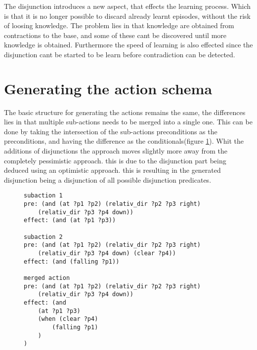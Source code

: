 	

%	
	


	The disjunction introduces a new aspect, that effects the learning process.  Which is that it is no longer possible to discard already learnt episodes,  without the risk of loosing knowledge. The problem lies in that knowledge are obtained from contractions to the base, and some of these cant be discovered until more knowledge is obtained. Furthermore the speed of learning is also effected since the disjunction cant be started to be learn before contradiction can be detected. 
	
	
	
	
\section{Generating the action schema}	
	
	The basic structure for generating the actions remains the same, the differences lies in that multiple sub-actions needs to be merged into a single one. This can be done by taking the intersection of the sub-actions preconditions as the preconditions, and having the difference as the conditionals(figure \ref{merge}). Whit the additions of disjunctions the approach moves slightly more away from the completely pessimistic approach. this is due to the disjunction part being deduced using an optimistic approach. this is resulting in the generated disjunction being a disjunction of all possible disjunction predicates.
\begin{figure}
	\label{merge}
		\begin{lstlisting}
subaction 1
pre: (and (at ?p1 ?p2) (relativ_dir ?p2 ?p3 right) 
	(relativ_dir ?p3 ?p4 down))
effect: (and (at ?p1 ?p3))
		
subaction 2
pre: (and (at ?p1 ?p2) (relativ_dir ?p2 ?p3 right) 
	(relativ_dir ?p3 ?p4 down) (clear ?p4))
effect: (and (falling ?p1))
		
merged action
pre: (and (at ?p1 ?p2) (relativ_dir ?p2 ?p3 right) 
	(relativ_dir ?p3 ?p4 down))
effect: (and 
	(at ?p1 ?p3)
	(when (clear ?p4) 
		(falling ?p1)
	)
)
\end{lstlisting}
\end{figure}	

